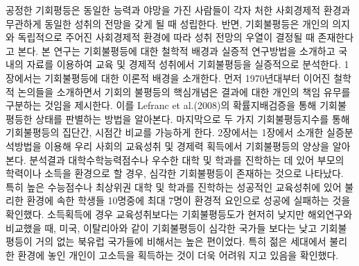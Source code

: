 공정한 기회평등은 동일한 능력과 야망을 가진 사람들이 각자 처한 사회경제적 환경과 무관하게 동일한 성취의 전망을 갖게 될 때 성립한다. 반면, 기회불평등은 개인의 의지와 독립적으로 주어진 사회경제적 환경에 따라 성취 전망의 우열이 결정될 때 존재한다고 본다. 본 연구는 기회불평등에 대한 철학적 배경과 실증적 연구방법을 소개하고 국내의 자료를 이용하여 교육 및 경제적 성취에서 기회불평등을 실증적으로 분석한다.
1장에서는 기회불평등에 대한 이론적 배경을 소개한다. 먼저 1970년대부터 이어진 철학적 논의들을 소개하면서 기회의 불평등의 핵심개념은 결과에 대한 개인의 책임 유무를 구분하는 것임을 제시한다. 이를 Lefranc et al.(2008)의 확률지배검증을 통해 기회불평등한 상태를 판별하는 방법을 알아본다. 마지막으로 두 가지 기회불평등지수를 통해 기회불평등의 집단간, 시점간 비교를 가능하게 한다.
2장에서는 1장에서 소개한 실증분석방법을 이용해 우리 사회의 교육성취 및 경제력 획득에서 기회불평등의 양상을 알아본다. 분석결과 대학수학능력점수나 우수한 대학 및 학과를 진학하는 데 있어 부모의 학력이나 소득을 환경으로 할 경우, 심각한 기회불평등이 존재하는 것으로 나타났다. 특히 높은 수능점수나 최상위권 대학 및 학과를 진학하는 성공적인 교육성취에 있어 불리한 환경에 속한 학생들 10명중에 최대 7명이 환경적 요인으로 성공에 실패하는 것을 확인했다. 소득획득에 경우 교육성취보다는 기회불평등도가 현저히 낮지만 해외연구와 비교했을 때, 미국, 이탈리아와 같이 기회불평등이 심각한 국가들 보다는 낮고 기회불평등이 거의 없는 북유럽 국가들에 비해서는 높은 편이었다. 특히 젊은 세대에서 불리한 환경에 놓인 개인이 고소득을 획득하는 것이 더욱 어려워 지고 있음을 확인했다.